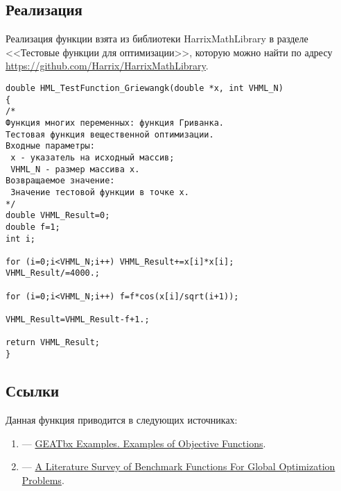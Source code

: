\subsection {Реализация}

Реализация функции взята из библиотеки HarrixMathLibrary в разделе <<Тестовые функции для оптимизации>>, которую можно найти по адресу \href{https://github.com/Harrix/HarrixMathLibrary} {https://github.com/Harrix/HarrixMathLibrary}.

\begin{lstlisting}[caption=Код функции HML\_TestFunction\_Griewangk]
double HML_TestFunction_Griewangk(double *x, int VHML_N)
{
/*
Функция многих переменных: функция Гриванка.
Тестовая функция вещественной оптимизации.
Входные параметры:
 x - указатель на исходный массив;
 VHML_N - размер массива x.
Возвращаемое значение:
 Значение тестовой функции в точке x.
*/
double VHML_Result=0;
double f=1;
int i;

for (i=0;i<VHML_N;i++) VHML_Result+=x[i]*x[i];
VHML_Result/=4000.;

for (i=0;i<VHML_N;i++) f=f*cos(x[i]/sqrt(i+1));

VHML_Result=VHML_Result-f+1.;

return VHML_Result;
}
\end{lstlisting}

\subsection {Ссылки}

Данная функция приводится в следующих источниках:

\begin{enumerate}
\item \cite[стр. 7]{web:GEATbxExamples} ---  \href{http://www.geatbx.com/download/GEATbx_ObjFunExpl_v38.pdf}{GEATbx Examples. Examples of Objective Functions}.
\item \cite[стр. 16]{article:2013arXiv1308.4008J} ---  \href{http://arxiv.org/pdf/1308.4008.pdf}{A Literature Survey of Benchmark Functions For Global Optimization Problems}.
\end{enumerate}